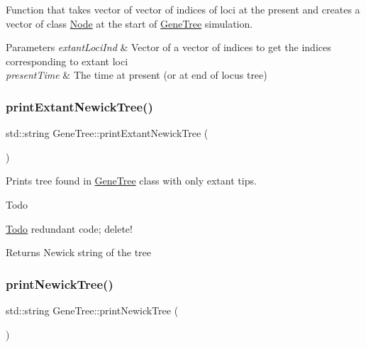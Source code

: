 Function that takes vector of vector of indices of loci at the present and creates a vector of class \mbox{\hyperlink{class_node}{Node}} at the start of \mbox{\hyperlink{class_gene_tree}{Gene\+Tree}} simulation. 


\begin{DoxyParams}{Parameters}
{\em extant\+Loci\+Ind} & Vector of a vector of indices to get the indices corresponding to extant loci \\
\hline
{\em present\+Time} & The time at present (or at end of locus tree) \\
\hline
\end{DoxyParams}
\mbox{\label{class_gene_tree_a877e150b8f85aded8a8a80bf466e6038}} 
\subsubsection{\texorpdfstring{printExtantNewickTree()}{printExtantNewickTree()}}
{\footnotesize\ttfamily std\+::string Gene\+Tree\+::print\+Extant\+Newick\+Tree (\begin{DoxyParamCaption}{ }\end{DoxyParamCaption})}



Prints tree found in \mbox{\hyperlink{class_gene_tree}{Gene\+Tree}} class with only extant tips. 

\begin{DoxyRefDesc}{Todo}
\item[\mbox{\hyperlink{todo__todo000005}{Todo}}]redundant code; delete! \end{DoxyRefDesc}
\begin{DoxyReturn}{Returns}
Newick string of the tree 
\end{DoxyReturn}
\mbox{\label{class_gene_tree_a5c9b307d48f39ed63b1a300153e808e1}} 
\subsubsection{\texorpdfstring{printNewickTree()}{printNewickTree()}}
{\footnotesize\ttfamily std\+::string Gene\+Tree\+::print\+Newick\+Tree (\begin{DoxyParamCaption}{ }\end{DoxyParamCaption})\hspace{0.3cm}{\ttfamily [virtual]}}



